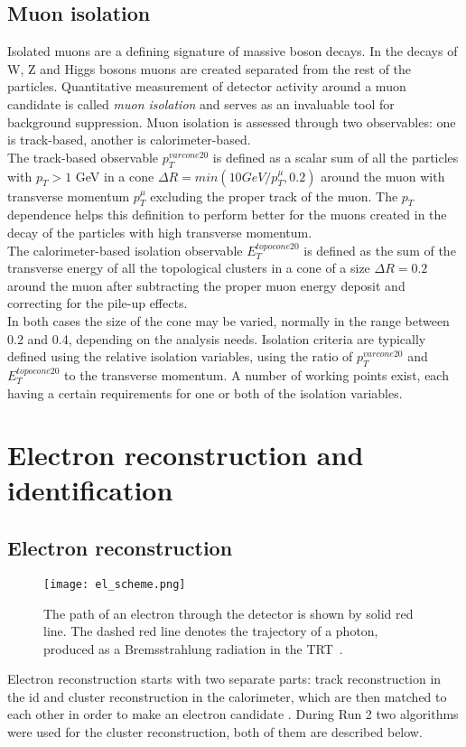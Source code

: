      \subsection{Muon isolation}   
     Isolated muons are a defining signature of massive boson decays. In the decays of W, Z and Higgs bosons muons are created separated from the rest of the particles. Quantitative measurement of detector activity around a muon candidate is called \textit{muon isolation} and serves as an invaluable tool for background suppression. Muon isolation is assessed through two observables: one is track-based, another is calorimeter-based. \\
     The track-based observable $p_T^{varcone20}$ is defined as a scalar sum of all the particles with $p_T>1$ GeV in a cone $\Delta R=min(10 GeV/p_T^{\mu},0.2)$ around the muon with transverse momentum $p_T^{\mu}$ excluding the proper track of the muon. The $p_T$ dependence helps this definition to perform better for the muons created in the decay of the particles with high transverse momentum.\\
     The calorimeter-based isolation observable $E_T^{topocone20}$ is defined as the sum of the transverse energy of all the topological clusters in a cone of a size $\Delta R = 0.2$ around the muon after subtracting the proper muon energy deposit and correcting for the pile-up effects.\\
     In both cases the size of the cone may be varied, normally in the range between 0.2 and 0.4, depending on the analysis needs. Isolation criteria are typically defined using the relative isolation variables, using the ratio of  $p_T^{varcone20}$ and $E_T^{topocone20}$ to the transverse momentum. A number of working points exist, each having a certain requirements for one or both of the isolation variables.
     
     \section{Electron reconstruction and identification}
     \subsection{Electron reconstruction}
           \begin{figure}[htbp]
     	\centering
     	\texttt{[image: el\_scheme.png]}
     	\caption[Electron path]{The path of an electron through the detector is shown by solid red line. The dashed red line denotes the trajectory of a photon, produced as a Bremsstrahlung radiation in the TRT~\cite{electrons_reco1}.}
     	\label{fig::el_id_scheme}
     \end{figure}
     Electron reconstruction starts with two separate parts: track reconstruction in the \gls{id} and cluster reconstruction in the calorimeter, which are then matched to each other in order to make an electron candidate \cite{electrons_reco1}. During Run 2 two algorithms were used for the cluster reconstruction, both of them are described below.\\
